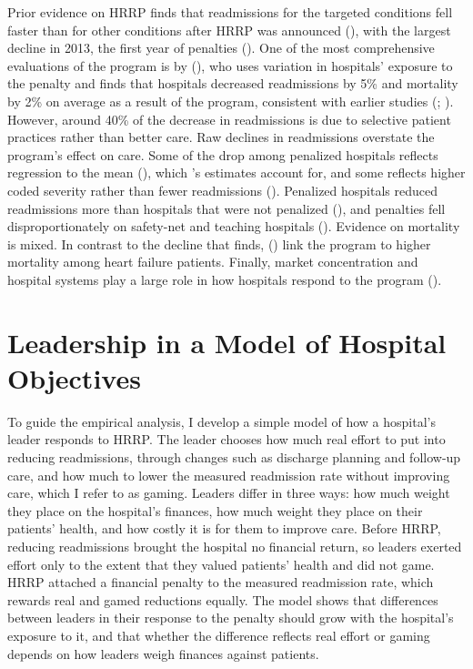 \documentclass[12pt]{article}
\theoremstyle{definition}   %
\begin{document}
    Prior evidence on HRRP finds that readmissions for the targeted conditions fell faster than for other conditions after HRRP was announced (\cite{zuckerman2016readmissions}), with the largest decline in 2013, the first year of penalties (\cite{medpac_2015}). One of the most comprehensive evaluations of the program is by \citeauthor{gupta2021impacts} (\citeyear{gupta2021impacts}), who uses variation in hospitals' exposure to the penalty and finds that hospitals decreased readmissions by 5\% and mortality by 2\% on average as a result of the program, consistent with earlier studies (\cite{mellor2017does}; \cite{ziedan2018essays}). However, around 40\% of the decrease in readmissions is due to selective patient practices rather than better care. Raw declines in readmissions overstate the program's effect on care. Some of the drop among penalized hospitals reflects regression to the mean (\cite{ody2019decreases}), which \citeauthor{gupta2021impacts}'s estimates account for, and some reflects higher coded severity rather than fewer readmissions (\cite{ibrahim2018association}). Penalized hospitals reduced readmissions more than hospitals that were not penalized (\cite{desai2016association}), and penalties fell disproportionately on safety-net and teaching hospitals (\cite{joynt2013characteristics}). Evidence on mortality is mixed. In contrast to the decline that \citeauthor{gupta2021impacts} finds, \citeauthor{wadhera2018association} (\citeyear{wadhera2018association}) link the program to higher mortality among heart failure patients. Finally, market concentration and hospital systems play a large role in how hospitals respond to the program (\cite{kunz2024assessing}).

    
\section{Leadership in a Model of Hospital Objectives}\label{sec:model}

To guide the empirical analysis, I develop a simple model of how a hospital's leader responds to HRRP. The leader chooses how much real effort to put into reducing readmissions, through changes such as discharge planning and follow-up care, and how much to lower the measured readmission rate without improving care, which I refer to as gaming. Leaders differ in three ways: how much weight they place on the hospital's finances, how much weight they place on their patients' health, and how costly it is for them to improve care. Before HRRP, reducing readmissions brought the hospital no financial return, so leaders exerted effort only to the extent that they valued patients' health and did not game. HRRP attached a financial penalty to the measured readmission rate, which rewards real and gamed reductions equally. The model shows that differences between leaders in their response to the penalty should grow with the hospital's exposure to it, and that whether the difference reflects real effort or gaming depends on how leaders weigh finances against patients.
\end{document}
